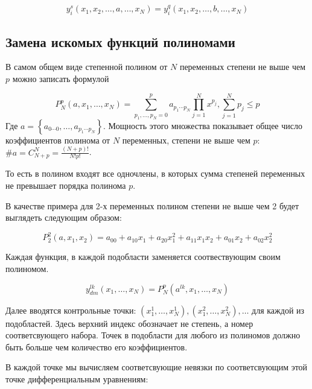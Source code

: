 \documentclass[a4paper,12pt]{article}
\begin{document}
  \begin{equation}
    y_i^s\left(x_1,x_2,\ldots,a,\ldots,x_N\right) = y_i^q\left(x_1,x_2,\ldots,b,\ldots,x_N\right)
  \end{equation}


  \subsection{Замена искомых функций полиномами}


  В самом общем виде степенной полином от $N$ переменных степени не выше чем $p$ можно
  записать формулой
  
  \begin{equation}
    P_N^p(a,x_1,\ldots,x_N)=
    \displaystyle\sum_{p_1,\ldots,p_N=0}^{p}a_{p_1 \cdots p_N}\prod_{j=1}^{N}x^{p_j},
    \displaystyle\sum_{j=1}^{N}p_j \le p
  \end{equation}
  Где $a = \left\{ a_{0 \cdots 0},\ldots,a_{p_1 \cdots p_N} \right\}$.
  Мощность этого множества показывает общее число
  коэффициентов полинома от $N$ переменных, степени не выше чем $p$:
  $ \#a = C_{N+p}^N = \frac{(N+p)!}{N!p!}$.
  
  То есть в полином входят все одночлены, в которых сумма степеней
  переменных не превышает порядка полинома $p$.

  В качестве примера для 2-х переменных полином степени не выше чем 2
  будет выглядеть следующим образом:

  \begin{equation*}
    P_2^2(a,x_1,x_2) = a_{00} + a_{10}x_1 + a_{20}x_1^2+ a_{11}x_1x_2 + a_{01}x_2 + a_{02}x_2^2
  \end{equation*}

  Каждая функция, в каждой подобласти заменяется соотвествующим своим
  полиномом.

  \begin{equation}
    y_{dm}^{lk}(x_1,\ldots,x_N) = P_N^p(a^{lk},x_1,\ldots,x_N)
  \end{equation}

  Далее вводятся контрольные точки:
  $(x_1^1,\ldots,x_N^1),(x_1^2,\ldots,x_N^2),\ldots$ для каждой из подобластей. Здесь верхний
  индекс обозначает не степень, а номер соответсвующего набора. Точек
  в подобласти для любого из полиномов должно быть больше чем
  количество его коэффициентов.

  В каждой точке мы вычисляем соответсвующие невязки по соответсвующим
  этой точке дифференциальным уравнениям:
\end{document}

